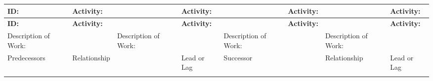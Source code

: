 \documentclass[10pt,letterpaper]{article}
\renewcommand\arraystretch{1.25}
\begin{document}
\begin{landscape}
\begin{center}
\begingroup
\setlength\tabcolsep{2.0pt}
\scriptsize
\renewcommand\arraystretch{1.55}
\begin{longtable}{|>{\raggedright\arraybackslash}p{1.026in}|>{\raggedright\arraybackslash}p{1.026in}|>{\raggedright\arraybackslash}p{1.026in}|>{\raggedright\arraybackslash}p{1.026in}|>{\raggedright\arraybackslash}p{1.026in}|>{\raggedright\arraybackslash}p{1.026in}|>{\raggedright\arraybackslash}p{1.026in}|>{\raggedright\arraybackslash}p{1.026in}|}
\hline
\rowcolor{light}
\textbf{ID:} & \textbf{Activity:} & \rule{0pt}{11pt}\hspace{0pt} & \textbf{Activity:} & \rule{0pt}{11pt}\hspace{0pt} & \textbf{Activity:} & \rule{0pt}{11pt}\hspace{0pt} & \textbf{Activity:} \\ \hline
\endfirsthead
\hline\rowcolor{light} \textbf{ID:} & \textbf{Activity:} & \rule{0pt}{11pt}\hspace{0pt} & \textbf{Activity:} & \rule{0pt}{11pt}\hspace{0pt} & \textbf{Activity:} & \rule{0pt}{11pt}\hspace{0pt} & \textbf{Activity:} \\ \hline
\endhead
Description of Work: & \rule{0pt}{11pt}\hspace{0pt} & Description of Work: & \rule{0pt}{11pt}\hspace{0pt} & Description of Work: & \rule{0pt}{11pt}\hspace{0pt} & Description of Work: & \rule{0pt}{11pt}\hspace{0pt} \\ \hline
Predecessors & Relationship & \rule{0pt}{11pt}\hspace{0pt} & Lead or Lag & Successor & \rule{0pt}{11pt}\hspace{0pt} & Relationship & Lead or Lag \\ \hline
\rule{0pt}{11pt}\hspace{0pt} & \rule{0pt}{11pt}\hspace{0pt} & \rule{0pt}{11pt}\hspace{0pt} & \rule{0pt}{11pt}\hspace{0pt} & \rule{0pt}{11pt}\hspace{0pt} & \rule{0pt}{11pt}\hspace{0pt} & \rule{0pt}{11pt}\hspace{0pt} & \rule{0pt}{11pt}\hspace{0pt} \\ \hline

\end{longtable}
\end{center}
\end{landscape}
\end{document}
